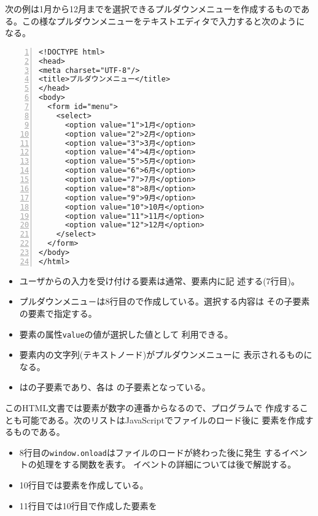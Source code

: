\begin{Exec}\upshape\label{PullDown}
 次の例は1月から12月までを選択できるプルダウンメニューを作成するものであ
 る。この様なプルダウンメニューをテキストエディタで入力すると次のように
 なる。\label{pulldown1}
\begin{Verbatim}[numbers=left]
<!DOCTYPE html>
<head>
<meta charset="UTF-8"/>
<title>プルダウンメニュー</title>
</head>
<body>
  <form id="menu">
    <select>
      <option value="1">1月</option>
      <option value="2">2月</option>
      <option value="3">3月</option>
      <option value="4">4月</option>
      <option value="5">5月</option>
      <option value="6">6月</option>
      <option value="7">7月</option>
      <option value="8">8月</option>
      <option value="9">9月</option>
      <option value="10">10月</option>
      <option value="11">11月</option>
      <option value="12">12月</option>
    </select>
  </form>
</body>
</html>
\end{Verbatim}
\begin{itemize}
 \item ユーザからの入力を受け付ける要素は通常、要素内に記
       述する(7行目)。
 \item プルダウンメニュ－は8行目ので作成している。選択する内容は
       その子要素の要素で指定する。
 \item {}要素の属性\texttt{value}の値が選択した値として
       利用できる。
 \item {}要素内の文字列(テキストノード)がプルダウンメニューに
       表示されるものになる。
 \item {}はの子要素であり、各は
       の子要素となっている。
\end{itemize}
 このHTML文書では要素が数字の連番からなるので、プログラムで
 作成することも可能である。次のリストはJavaScriptでファイルのロード後に
 要素を作成するものである。
\label{pulldown2}
\begin{itemize}
 \item 8行目の\texttt{window.onload}はファイルのロードが終わった後に発生
       するイベントの処理をする関数を表す。
       イベントの詳細については後で解説する。
 \item 10行目では要素を作成している。
 \item 11行目では10行目で作成した要素を

\end{itemize}
\end{Exec}
